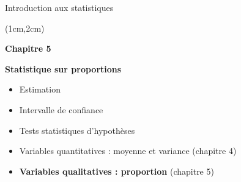 \documentclass{beamer}
\begin{document}

\begin{frame}{Introduction aux statistiques}
\begin{textblock*}{\textwidth}(1cm,2cm)

\begin{center}{\bf \Large Chapitre 5} \end{center}
\begin{center}{\bf \Large Statistique sur proportions} \end{center}
\vspace{0.5cm}
\begin{itemize}
\item Estimation  
\item Intervalle de confiance
\item Tests statistiques d'hypothèses
\end{itemize}
\vspace{0.5cm}
\begin{itemize}
\item Variables quantitatives : moyenne et variance (chapitre 4)
\item {\bf Variables qualitatives : proportion} (chapitre 5)
\end{itemize}

 \end{textblock*}

\end{frame}


\end{document}
